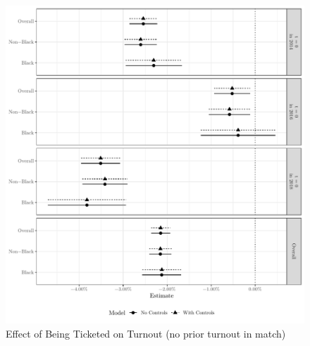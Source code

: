\documentclass[
  12pt,
]{article}
\begin{document}
\begin{figure}[H]

{\centering \includegraphics{compile_files/figure-latex/coef-plot-no-prior-1} 

}

\caption{\label{fig:did-1}Effect of Being Ticketed on Turnout (no prior turnout in match)}\label{fig:coef-plot-no-prior}
\end{figure}
\end{document}
